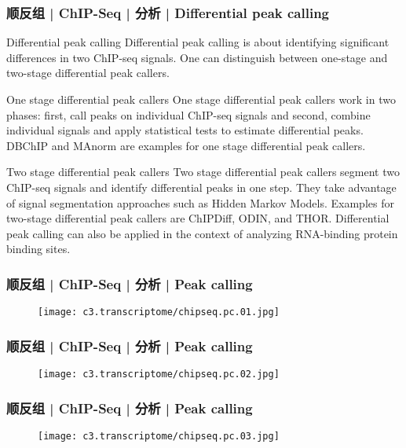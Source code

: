 \begin{frame}
  \frametitle{顺反组 | ChIP-Seq | 分析 | Differential peak calling}
  {\footnotesize
  \begin{block}{Differential peak calling}
  Differential peak calling is about identifying significant differences in two ChIP-seq signals. One can distinguish between one-stage and two-stage differential peak callers.
  \end{block}
  \pause
  \begin{block}{One stage differential peak callers}
    One stage differential peak callers work in two phases: first, call peaks on individual ChIP-seq signals and second, combine individual signals and apply statistical tests to estimate differential peaks. DBChIP and MAnorm are examples for one stage differential peak callers.
  \end{block}
  \pause
  \begin{block}{Two stage differential peak callers}
 Two stage differential peak callers segment two ChIP-seq signals and identify differential peaks in one step. They take advantage of signal segmentation approaches such as Hidden Markov Models. Examples for two-stage differential peak callers are ChIPDiff, ODIN, and THOR. Differential peak calling can also be applied in the context of analyzing RNA-binding protein binding sites. 
  \end{block}
  }
\end{frame}

\begin{frame}
  \frametitle{顺反组 | ChIP-Seq | 分析 | Peak calling}
  \begin{figure}
    \centering
    \texttt{[image: c3.transcriptome/chipseq.pc.01.jpg]}
  \end{figure}
\end{frame}

\begin{frame}
  \frametitle{顺反组 | ChIP-Seq | 分析 | Peak calling}
  \begin{figure}
    \centering
    \texttt{[image: c3.transcriptome/chipseq.pc.02.jpg]}
  \end{figure}
\end{frame}

\begin{frame}
  \frametitle{顺反组 | ChIP-Seq | 分析 | Peak calling}
  \begin{figure}
    \centering
    \texttt{[image: c3.transcriptome/chipseq.pc.03.jpg]}
  \end{figure}
\end{frame}

